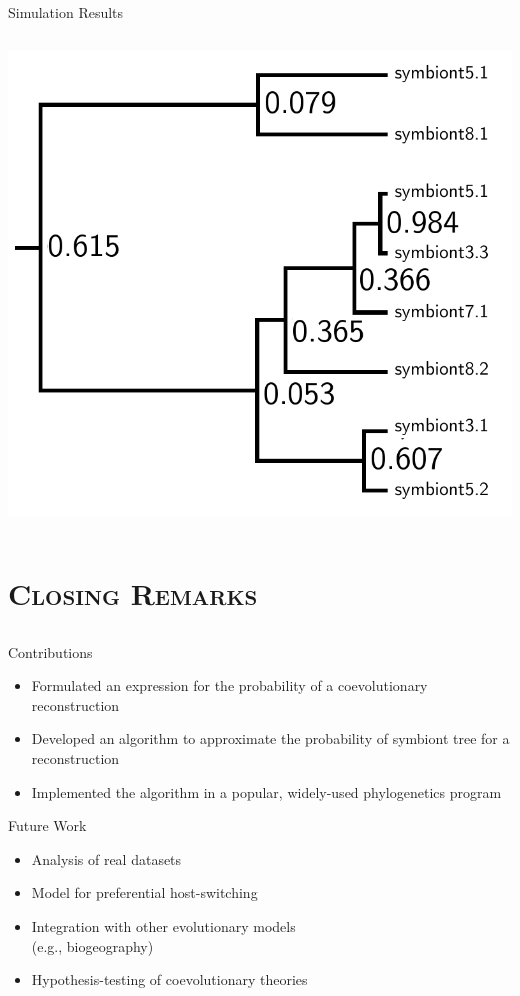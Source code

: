 \documentclass{beamer}
\let\oldsection\section
\renewcommand{\section}[1]{\oldsection{\textsc{#1}}\subsection{}}
\begin{document}
\begin{frame}{Simulation Results}
\begin{columns}
\begin{column}{0.5\textwidth}
\includegraphics[width=\textwidth]{figures/sim2.pdf}
\end{column}

\end{columns}
\end{frame}

\section{Closing Remarks}

\begin{frame}{Contributions}

\begin{itemize}
\item Formulated an expression for the probability of a coevolutionary reconstruction \pause
\item Developed an algorithm to approximate the probability of symbiont tree for a reconstruction \pause
\item Implemented the algorithm in a popular, widely-used phylogenetics program
\end{itemize}

\end{frame}

\begin{frame}{Future Work}

\begin{itemize}
\item Analysis of real datasets \pause
\item Model for preferential host-switching \pause
\item Integration with other evolutionary models\\(e.g., biogeography) \pause
\item Hypothesis-testing of coevolutionary theories

\end{itemize}

\end{frame}
\end{document}
